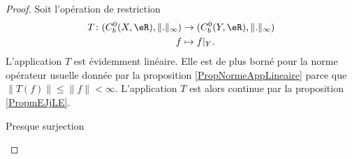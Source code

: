 \begin{proof}
    Soit l'opération de restriction
    \begin{equation}
        \begin{aligned}
            T\colon (C^0_b(X,\eR),\| . \|_{\infty})&\to (C^0_b(Y,\eR),\| . \|_{\infty}) \\
            f&\mapsto f|_Y. 
        \end{aligned}
    \end{equation}
    L'application \( T\) est évidemment linéaire. Elle est de plus borné pour la norme opérateur usuelle donnée par la proposition \ref{PropNormeAppLineaire} parce que \( \| T(f) \|\leq \| f \|<\infty\). L'application \( T\) est alors continue par la proposition \ref{PropmEJjLE}.

    \begin{subproof}
    \item[Presque surjection]


\end{subproof}
\end{proof}
